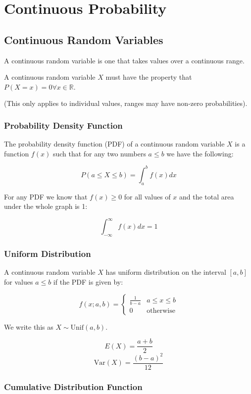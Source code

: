 \section{Continuous Probability}

\subsection*{Continuous Random Variables}

A continuous random variable is one that takes values over a continuous range.

A continuous random variable $X$ must have the property that $P(X=x)=0 \forall x \in \mathbb{R}$.

(This only applies to individual values, ranges may have non-zero probabilities).

\subsubsection*{Probability Density Function}

The probability density function (PDF) of a continuous random variable $X$ is a function $f(x)$ such that for any two numbers $a\leq b$ we have the following:

$$ P(a \leq X \leq b) = \int_a^b f(x) dx $$

For any PDF we know that $f(x) \geq 0$ for all values of $x$ and the total area under the whole graph is 1:

$$ \int_{-\infty}^{\infty} f(x) dx = 1 $$

\subsubsection*{Uniform Distribution}

A continuous random variable $X$ has uniform distribution on the interval $[a,b]$ for values $a \leq b$ if the PDF is given by:

$$ f(x; a,b) = \begin{cases} \frac{1}{b-a} & a \leq x \leq b \\ 0 & \text{otherwise} \end{cases} $$

We write this as $X \sim \text{Unif}(a,b)$.

$$ E(X) = \frac{a+b}{2} $$
$$ \text{Var}(X) = \frac{(b-a)^2}{12} $$

\subsubsection*{Cumulative Distribution Function}

